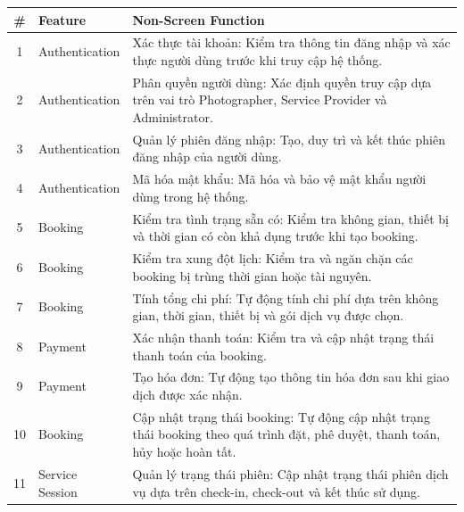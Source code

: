 \begin{table}[H]
	\centering
	\begin{tabular}{|c|p{3cm}|p{6cm}|}
		\hline
		\textbf{\#} & \textbf{Feature} & \textbf{Non-Screen Function} \\
		\hline
		
		1 & Authentication & Xác thực tài khoản: Kiểm tra thông tin đăng nhập và xác thực người dùng trước khi truy cập hệ thống. \\
		\hline
		
		2 & Authentication & Phân quyền người dùng: Xác định quyền truy cập dựa trên vai trò Photographer, Service Provider và Administrator. \\
		\hline
		
		3 & Authentication & Quản lý phiên đăng nhập: Tạo, duy trì và kết thúc phiên đăng nhập của người dùng. \\
		\hline
		
		4 & Authentication & Mã hóa mật khẩu: Mã hóa và bảo vệ mật khẩu người dùng trong hệ thống. \\
		\hline
		
		5 & Booking & Kiểm tra tình trạng sẵn có: Kiểm tra không gian, thiết bị và thời gian có còn khả dụng trước khi tạo booking. \\
		\hline
		
		6 & Booking & Kiểm tra xung đột lịch: Kiểm tra và ngăn chặn các booking bị trùng thời gian hoặc tài nguyên. \\
		\hline
		
		7 & Booking & Tính tổng chi phí: Tự động tính chi phí dựa trên không gian, thời gian, thiết bị và gói dịch vụ được chọn. \\
		\hline
		
		8 & Payment & Xác nhận thanh toán: Kiểm tra và cập nhật trạng thái thanh toán của booking. \\
		\hline
		
		9 & Payment & Tạo hóa đơn: Tự động tạo thông tin hóa đơn sau khi giao dịch được xác nhận. \\
		\hline
		
		10 & Booking & Cập nhật trạng thái booking: Tự động cập nhật trạng thái booking theo quá trình đặt, phê duyệt, thanh toán, hủy hoặc hoàn tất. \\
		\hline
		
		11 & Service Session & Quản lý trạng thái phiên: Cập nhật trạng thái phiên dịch vụ dựa trên check-in, check-out và kết thúc sử dụng. \\
		\hline
		

\end{tabular}
\end{table}
